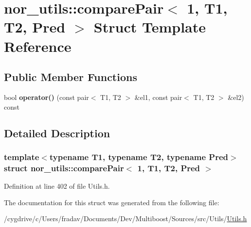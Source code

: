 \hypertarget{structnor__utils_1_1comparePair_3_011_00_01T1_00_01T2_00_01Pred_01_4}{
\section{nor\_\-utils::comparePair$<$ 1, T1, T2, Pred $>$ Struct Template Reference}
\label{structnor__utils_1_1comparePair_3_011_00_01T1_00_01T2_00_01Pred_01_4}
}
\subsection*{Public Member Functions}
\begin{DoxyCompactItemize}
\item 
\hypertarget{structnor__utils_1_1comparePair_3_011_00_01T1_00_01T2_00_01Pred_01_4_af66f0663403b877662dee80da5c6883e}{
bool {\bfseries operator()} (const pair$<$ T1, T2 $>$ \&el1, const pair$<$ T1, T2 $>$ \&el2) const }
\label{structnor__utils_1_1comparePair_3_011_00_01T1_00_01T2_00_01Pred_01_4_af66f0663403b877662dee80da5c6883e}

\end{DoxyCompactItemize}


\subsection{Detailed Description}
\subsubsection*{template$<$typename T1, typename T2, typename Pred$>$struct nor\_\-utils::comparePair$<$ 1, T1, T2, Pred $>$}



Definition at line 402 of file Utils.h.



The documentation for this struct was generated from the following file:\begin{DoxyCompactItemize}
\item 
/cygdrive/c/Users/fradav/Documents/Dev/Multiboost/Sources/src/Utils/\hyperlink{Utils_8h}{Utils.h}\end{DoxyCompactItemize}
